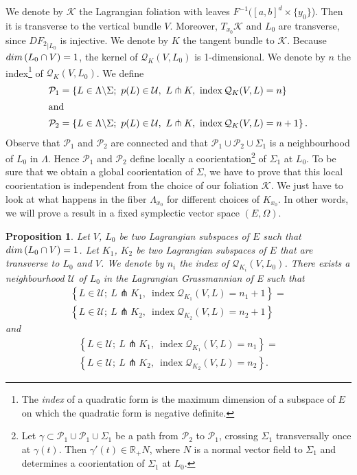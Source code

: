 \documentclass[10pt,a4paper]{amsart}
\numberwithin{equation}{section}
\renewcommand*\P{\mathcal{P}}
\newcommand*\cq{\mathcal{Q}}
\newcommand*\cU{\mathcal{U}}
\newcommand*\cal{\mathcal}
\newcommand*\R{\mathbb{R}}
\renewcommand*\dim{{\rm dim}\,}
\DeclareMathOperator{\Iindex}{index}
\newtheorem{prop}[theo]{Proposition}
\theoremstyle{definition}
\theoremstyle{remark}
\begin{document}
We denote by ${\cal K}$ the Lagrangian foliation with leaves $F^{-1}([a, b]^d\times \{y_0\}$). Then it is transverse to the vertical bundle $V$. Moreover, $T_{x_0}{\cal K}$ and $L_0$ are transverse, since ${DF_2}_{\vert L_0}$ is injective. We denote by $K$ the tangent bundle to ${\cal K}$. { Because $\dim(L_0\cap V)=1$,} the kernel of $\cq_{K}(V, L_0)$ is 1-dimensional. We denote by $n$ the index\footnote{The \emph{index} of a quadratic form is the maximum dimension of a subspace of $E$ on which the quadratic form is negative definite.} of $\cq_{K}(V, L_0)$. We define
\begin{align*}
\P_1 &= \left\{ L\in \Lambda\backslash \Sigma;\ p(L)\in \cU,\ L\pitchfork K,\ \Iindex\cq_{K}(V, L)=n\right\}
\\
\intertext{and}
\P_2 &= \left\{ L\in \Lambda\backslash \Sigma;\ p(L)\in \cU,\ L\pitchfork K,\ \Iindex\cq_{K}(V, L)=n+1\right\}.
\end{align*}
Observe that $\P_1$ and $\P_2$ are connected and that $\P_1\cup{\P_2}\cup \Sigma_1$ is a neighbourhood of $L_0$ in $\Lambda$. Hence $\P_1$ and $\P_2$ define locally a coorientation\footnote{Let $\gamma\subset \P_1\cup\P_1\cup \Sigma_1$ be a path from $\P_2$ to $\P_1$, crossing $\Sigma_1$ transversally once at $\gamma(t)$. Then $\gamma'(t)\in \R_+ N$, where $N$ is a normal vector field to $\Sigma_1$ and determines a coorientation of $\Sigma_1$ at $L_0$.} of $\Sigma_1$ at $L_0$. To be sure that we obtain a global coorientation of $\Sigma$, we have to prove that this local coorientation is independent from the choice of our foliation ${\cal K}$. We just have to look at what happens in the fiber $\Lambda_{x_0}$ for different choices of $K_{x_0}$. In other words, we will prove a result in a fixed symplectic vector space $(E, \Omega)$.

\begin{prop}\label{Pcoorientation}
Let $V$, $L_0$ be two Lagrangian subspaces of $E$ such that $\dim (L_0\cap V)=1$. Let $K_1$, $K_2$ be two Lagrangian subspaces of $E$ that are transverse to $L_0$ and $V$. We denote by $n_i$ the index of $\cq_{K_i}(V, L_0)$. There exists a neighbourhood $\cal U$ of $L_0$ in the Lagrangian Grassmannian of E such that
\begin{multline*}
\left\{ L\in \cU;\ L\pitchfork K_1,\ \Iindex\cq_{K_1}(V, L)=n_1+1\right\}=\\
\left\{ L\in \cU;\ L\pitchfork K_2,\ \Iindex\cq_{K_2}(V, L)=n_2+1\right\}
\end{multline*}
and
\begin{multline*}
\left\{ L\in \cU;\ L\pitchfork K_1,\ \Iindex\cq_{K_1}(V, L)=n_1\right\}=\\
\left\{ L\in \cU;\ L\pitchfork K_2,\ \Iindex\cq_{K_2}(V, L)=n_2\right\}.
\end{multline*}
\end{prop}
\end{document}
